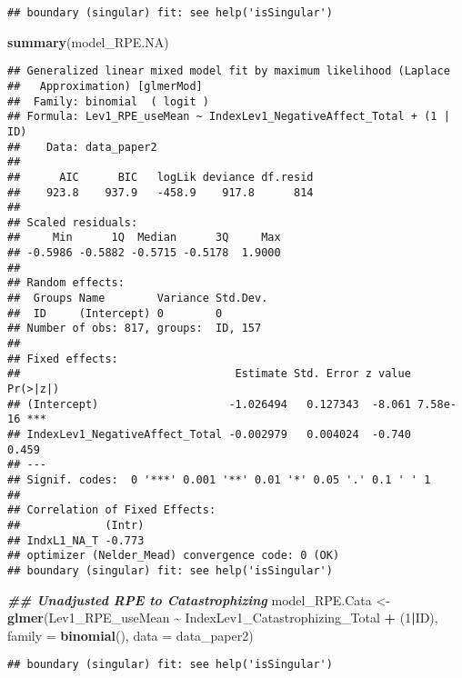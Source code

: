 \documentclass[
  12pt,
]{article}
\newenvironment{Shaded}{\begin{snugshade}}{\end{snugshade}}
\newcommand{\AttributeTok}[1]{\textcolor[rgb]{0.13,0.29,0.53}{#1}}
\newcommand{\DecValTok}[1]{\textcolor[rgb]{0.00,0.00,0.81}{#1}}
\newcommand{\DocumentationTok}[1]{\textcolor[rgb]{0.56,0.35,0.01}{\textbf{\textit{#1}}}}
\newcommand{\FunctionTok}[1]{\textcolor[rgb]{0.13,0.29,0.53}{\textbf{#1}}}
\newcommand{\NormalTok}[1]{#1}
\newcommand{\OtherTok}[1]{\textcolor[rgb]{0.56,0.35,0.01}{#1}}
\newcommand{\SpecialCharTok}[1]{\textcolor[rgb]{0.81,0.36,0.00}{\textbf{#1}}}
\begin{document}
\begin{verbatim}
## boundary (singular) fit: see help('isSingular')
\end{verbatim}

\begin{Shaded}
\begin{Highlighting}[]
\FunctionTok{summary}\NormalTok{(model\_RPE.NA)}
\end{Highlighting}
\end{Shaded}

\begin{verbatim}
## Generalized linear mixed model fit by maximum likelihood (Laplace
##   Approximation) [glmerMod]
##  Family: binomial  ( logit )
## Formula: Lev1_RPE_useMean ~ IndexLev1_NegativeAffect_Total + (1 | ID)
##    Data: data_paper2
## 
##      AIC      BIC   logLik deviance df.resid 
##    923.8    937.9   -458.9    917.8      814 
## 
## Scaled residuals: 
##     Min      1Q  Median      3Q     Max 
## -0.5986 -0.5882 -0.5715 -0.5178  1.9000 
## 
## Random effects:
##  Groups Name        Variance Std.Dev.
##  ID     (Intercept) 0        0       
## Number of obs: 817, groups:  ID, 157
## 
## Fixed effects:
##                                 Estimate Std. Error z value Pr(>|z|)    
## (Intercept)                    -1.026494   0.127343  -8.061 7.58e-16 ***
## IndexLev1_NegativeAffect_Total -0.002979   0.004024  -0.740    0.459    
## ---
## Signif. codes:  0 '***' 0.001 '**' 0.01 '*' 0.05 '.' 0.1 ' ' 1
## 
## Correlation of Fixed Effects:
##             (Intr)
## IndxL1_NA_T -0.773
## optimizer (Nelder_Mead) convergence code: 0 (OK)
## boundary (singular) fit: see help('isSingular')
\end{verbatim}

\begin{Shaded}
\begin{Highlighting}[]
 \DocumentationTok{\#\# Unadjusted RPE to Catastrophizing}
\NormalTok{model\_RPE.Cata }\OtherTok{\textless{}{-}} \FunctionTok{glmer}\NormalTok{(Lev1\_RPE\_useMean }\SpecialCharTok{\textasciitilde{}}\NormalTok{ IndexLev1\_Catastrophizing\_Total }\SpecialCharTok{+}\NormalTok{ (}\DecValTok{1}\SpecialCharTok{|}\NormalTok{ID), }\AttributeTok{family =} \FunctionTok{binomial}\NormalTok{(), }\AttributeTok{data =}\NormalTok{ data\_paper2)}
\end{Highlighting}
\end{Shaded}

\begin{verbatim}
## boundary (singular) fit: see help('isSingular')
\end{verbatim}
\end{document}
